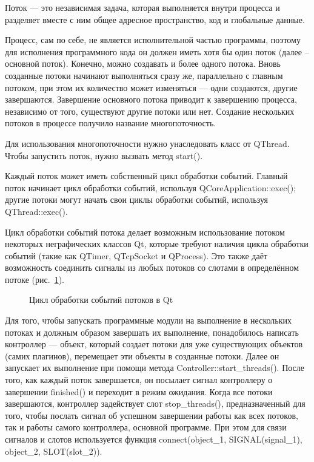 Поток — это независимая задача, которая выполняется внутри процесса и разделяет вместе с ним общее адресное пространство, код и глобальные данные.

Процесс, сам по себе, не является исполнительной частью программы, поэтому для исполнения программного кода он должен иметь хотя бы один поток (далее -- основной поток). Конечно, можно создавать и более одного потока. Вновь созданные потоки начинают выполняться сразу же, параллельно с главным потоком, при этом их количество может изменяться — одни создаются, другие завершаются. Завершение основного потока приводит к завершению процесса, независимо от того, существуют другие потоки или нет. Создание нескольких потоков в процессе получило название многопоточность. \cite{threadsandprocesses}

Для использования многопоточности нужно унаследовать класс от QThread. Чтобы запустить поток, нужно вызвать метод start().

Каждый поток может иметь собственный цикл обработки событий. Главный поток начинает цикл обработки событий, используя QCoreApplication::exec(); другие потоки могут начать свои циклы обработки событий, используя QThread::exec().

Цикл обработки событий потока делает возможным использование потоком некоторых неграфических классов Qt, которые требуют наличия цикла обработки событий (такие как QTimer, QTcpSocket и QProcess). Это также даёт возможность соединить сигналы из любых потоков со слотами в определённом потоке (рис.~\ref{thread-cycle:thread-cycle}). \cite{threads}

\begin{figure}[h!]
\caption{ Цикл обработки событий потоков в Qt }
\label{thread-cycle:thread-cycle}
\end{figure}

Для того, чтобы запускать программные модули на выполнение в нескольких потоках и должным образом завершать их выполнение, понадобилось написать контроллер --- объект, который создает потоки для уже существующих объектов (самих плагинов), перемещает эти объекты в созданные потоки. Далее он запускает их выполнение при помощи метода Controller::start\_threads(). После того, как каждый поток завершается, он посылает сигнал контроллеру о завершении finished() и переходит в режим ожидания. Когда все потоки завершаются, контроллер задействует слот stop\_threads(), предназначенный для того, чтобы послать сигнал об успешном завершении работы как всех потоков, так и работы самого контроллера, основной программе. При этом для связи сигналов и слотов используется функция connect(object\_1, SIGNAL(signal\_1), object\_2, SLOT(slot\_2)).  

